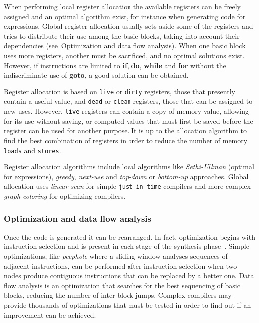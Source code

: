 When performing local register allocation the available registers can be freely
assigned and an optimal algorithm exist, for instance when generating code for
expressions.  Global register allocation usually sets aside some of the
registers and tries to distribute their use among the basic blocks, taking into
account their dependencies (see~Optimization and data flow analysis).
When one basic block uses more
registers, another must be sacrificed, and no optimal solutions exist.  However,
if instructions are limited to {\bf if}, {\bf do}, {\bf while} and {\bf for}
without the indiscriminate use of {\bf goto}, a good solution can be obtained.

Register allocation is based on {\tt live} or {\tt dirty} registers, those that
presently contain a useful value, and {\tt dead} or {\tt clean} registers,
those that can be assigned to new uses.
However, {\tt live} registers can contain a copy of
memory value, allowing for its use without saving, or computed values that must
first be saved before the register can be used for another purpose.  It is up to
the allocation algorithm to find the best combination of registers in order to
reduce the number of memory {\tt loads} and {\tt stores}.

Register allocation algorithms include local algorithms like {\em Sethi-Ullman}
(optimal for expressions), {\em greedy}, {\em next-use} and {\em top-down} or
{\em bottom-up} approaches.  Global allocation uses {\em linear scan} for simple
{\tt just-in-time} compilers and more complex {\em graph coloring} for optimizing
compilers.

\subsubsection{Optimization and data flow analysis} \label{dataflow}

Once the code is generated it can be rearranged.  In fact, optimization begins
with instruction selection and is present in each stage of the synthesis
phase~\cite{allen01,muchnick97}.
Simple optimizations, like {\em peephole} where a sliding window analyses
sequences of adjacent instructions, can be performed after instruction
selection when two nodes produce contiguous instructions that can be
replaced by a better one.
Data flow analysis is an optimization that searches for the best
sequencing of basic blocks, reducing the number of inter-block jumps.  Complex
compilers may provide thousands of optimizations that must be tested in order to
find out if an improvement can be achieved.

